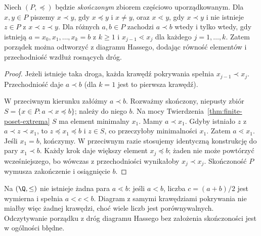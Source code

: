 \begin{twierdzenie}
\label{thm:hasse-paths-xliii}
Niech $(P,\preceq)$ będzie \emph{skończonym} zbiorem
częściowo uporządkowanym. Dla $x,y\in P$ piszemy $x\prec y$,
gdy $x\preceq y$ i $x\ne y$, oraz $x\lessdot y$,
gdy $x\prec y$ i nie istnieje $z\in P$ z $x\prec z\prec y$.
Dla różnych $a,b\in P$ zachodzi $a\prec b$
wtedy i tylko wtedy, gdy istnieją
$a=x_0,x_1,\ldots,x_k=b$ z $k\ge1$ i
$x_{j-1}\lessdot x_j$ dla każdego $j=1,\ldots,k$.
Zatem porządek można odtworzyć z diagramu Hassego,
dodając równość elementów i przechodniość wzdłuż
rosnących dróg.
\end{twierdzenie}
\begin{proof}
Jeżeli istnieje taka droga, każda krawędź pokrywania
spełnia $x_{j-1}\prec x_j$. Przechodniość daje
$a\prec b$ (dla $k=1$ jest to pierwsza krawędź).

W przeciwnym kierunku załóżmy $a\prec b$.
Rozważmy skończony, niepusty zbiór
$S=\{x\in P:a\prec x\preceq b\}$; należy do niego $b$.
Na mocy Twierdzenia~\ref{thm:finite-poset-extrema}
$S$ ma element minimalny $x_1$. Mamy $a\prec x_1$.
Gdyby istniało $z$ z $a\prec z\prec x_1$, to
$z\preceq x_1\preceq b$ i $z\in S$,
co przeczyłoby minimalności $x_1$. Zatem $a\lessdot x_1$.
Jeśli $x_1=b$, kończymy. W przeciwnym razie stosujemy
identyczną konstrukcję do pary $x_1\prec b$.
Każdy krok daje większy element $x_j\preceq b$;
żaden nie może powtórzyć wcześniejszego, bo wówczas
z przechodniości wynikałoby $x_j\prec x_j$.
Skończoność $P$ wymusza zakończenie i osiągnięcie $b$.
\end{proof}
\begin{przyklad}
\label{ex:hasse-infinite-caution-xliii}
Na $(\Q,\le)$ nie istnieje żadna para $a\lessdot b$:
jeśli $a<b$, liczba $c=(a+b)/2$ jest wymierna i
spełnia $a<c<b$. Diagram z samymi krawędziami
pokrywania nie miałby więc żadnej krawędzi, choć
wiele liczb jest porównywalnych. Odczytywanie porządku
z dróg diagramu Hassego bez założenia skończoności
jest w ogólności błędne.
\end{przyklad}


